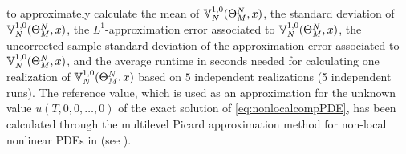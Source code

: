 to approximately calculate
the mean of %
$
{\mathbb{V}}^{1,0}_N(\Theta^N_M,x)
$,
the standard deviation of %
$
{\mathbb{V}}^{1,0}_N(\Theta^N_M,x)
$,
the $ L^1 $-approximation error associated to %
$
{\mathbb{V}}^{1,0}_N(\Theta^N_M,x)
$,
the uncorrected sample standard deviation of the approximation error associated to %
$
{\mathbb{V}}^{1,0}_N(\Theta^N_M,x)
$,
and the average runtime in seconds needed for calculating one realization of $
{\mathbb{V}}^{1,0}_N(\Theta^N_M,x)
$
%
based on $5$ independent realizations (5 independent runs).
%
The reference value, which is used as an approximation for the unknown value $u(T,0,0,\ldots,0)$ of the exact solution of \eqref{eq:nonlocalcompPDE},  has been calculated through the multilevel Picard approximation method for non-local nonlinear PDEs in  (see ).


